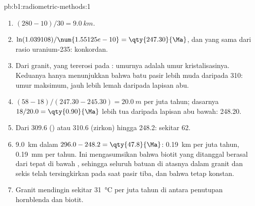 \begin{solution}{pb:b1:radiometric-methods:1}
\begin{enumerate}
        17: ketidakpastiannya berasal dari , bukan dari umur.
  \item $(280 - 10)/30 = \qty{9.0}{km}$.
  \item $\ln(1.039108)/\num{1.55125e-10} = \qty{247.30}{\Ma}$, dan yang sama dari rasio
        uranium-235: konkordan.
  \item Dari granit, yang tererosi pada : umurnya adalah umur
        kristalisasinya. Keduanya hanya menunjukkan bahwa batu pasir lebih muda daripada
        \qty{310}{\Ma}: umur maksimum, jauh lebih lemah daripada lapisan abu.
  \item $(58 - 18)/(247.30 - 245.30) = \qty{20.0}{m}$ per juta tahun; dasarnya
        $18/20.0 = \qty{0.90}{\Ma}$ lebih tua daripada lapisan abu bawah:
        \qty{248.20}{\Ma}.
  \item Dari \qty{309.6}{\Ma} () atau \qty{310.6}{\Ma} (zirkon) hingga
        \qty{248.2}{\Ma}: sekitar \qty{62}{\Ma}.
  \item \qty{9.0}{km} dalam $296.0 - 248.2 = \qty{47.8}{\Ma}$: \qty{0.19}{km} per juta
        tahun, \qty{0.19}{mm} per tahun. Ini mengasumsikan bahwa biotit yang ditanggal berasal
        dari tepat di bawah , sehingga seluruh batuan di atasnya dalam granit
        dan sekis telah tersingkirkan pada saat pasir tiba, dan bahwa  tetap konstan.
  \item Granit mendingin sekitar \qty{31}{\celsius} per juta tahun di antara penutupan
        hornblenda dan biotit.
\end{enumerate}
\end{solution}
